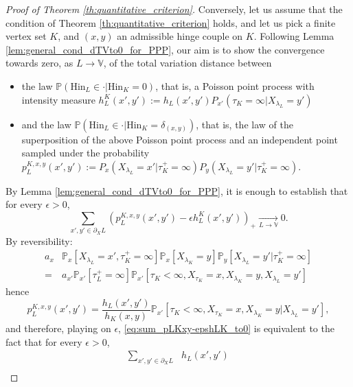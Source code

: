 \documentclass[10pt,a4paper]{amsart}
\newcommand{\Hin}{\mathrm{Hin}}
\newcommand{\p}{\mathbb{P}}
\begin{document}
\begin{proof}[Proof of Theorem \ref{th:quantitative_criterion}]
\medskip 

Conversely, let us assume that the condition of Theorem \ref{th:quantitative_criterion} holds, and let us pick a finite vertex set $K$, and $(x,y)$ an admissible hinge couple on $K$. Following Lemma \ref{lem:general_cond_dTVto0_for_PPP}, our aim is to show the convergence towards zero, as $L\to\mathbb{V}$, of the total variation distance between
\begin{itemize}
  \item the law 
  $\mathbb{P}(\Hin_L \in \cdot | \Hin_K=0)$, that is, a Poisson point process with intensity measure 
  $h_{L}^{K}(x',y') := h_L(x',y') P_{x'}(\tau_K=\infty|X_{\lambda_L}=y')$
  \item and the law 
  $\mathbb{P}(\Hin_L \in \cdot | \Hin_K=\delta_{(x,y)})$, that is, the law of the superposition of the above Poisson point process and an independent point sampled under the probability 
  $p_{L}^{K, x,y} (x', y'):= P_x(X_{\lambda_L}= x'| \tau_K^+=\infty) P_y(X_{\lambda_L}= y'| \tau_K^+=\infty)$.
\end{itemize}
By Lemma \ref{lem:general_cond_dTVto0_for_PPP}, it is enough to establish that for every $\epsilon>0$, 
\begin{equation}\label{eq:sum_pLKxy-epshLK_to0}
  \sum_{x',y' \in \partial_X L} 
  \left(p_L^{K, x, y}(x',y') 
  - \epsilon h_L^{K}(x',y') \right)_+  \underset{L \to \mathbb{V}}{\longrightarrow} 0.
\end{equation}
By reversibility:
\begin{equation}
  \begin{aligned}
  a_x &  \p_x[X_{\lambda_L}=x', \tau_K^+=\infty]   \p_x[X_{\lambda_K}=y] \p_y[X_{\lambda_L}=y' | \tau_K^+=\infty] \\
   =  & a_{x'} \p_{x'}[\tau_L^+=\infty]
   \p_{x'}[\tau_K < \infty, X_{\tau_K} = x, X_{\lambda_K}=y, X_{\lambda_L}=y']
  \end{aligned}
\end{equation}
hence
\begin{equation}
  p_L^{K, x, y}(x',y')= \frac {h_L(x', y')}{ h_K(x, y)} 
  \p_{x'}[\tau_K < \infty, X_{\tau_K} = x, X_{\lambda_K}=y| X_{\lambda_L}=y'],
\end{equation}%
and therefore, playing on $\epsilon$, \eqref{eq:sum_pLKxy-epshLK_to0} is equivalent to the fact that for every $\epsilon>0$, 
\begin{equation}
  \begin{aligned}
    \sum_{x', y'\in \partial_X L} &  h_L(x', y') \\

\end{aligned}
\end{equation}
\end{proof}
\end{document}
